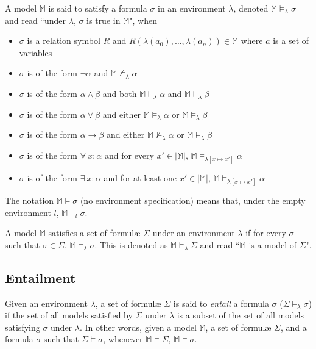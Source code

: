 		A model $\mathbb{M}$ is said to satisfy a formula $\sigma$ in an
		environment $\lambda$, denoted $\mathbb{M} \models_\lambda \sigma$ and
		read ``under $\lambda$, $\sigma$ is true in $\mathbb{M}$", when
		\begin{itemize}
		\item $\sigma$ is a relation symbol $R$ and $R(\lambda(a_0) , \ldots , \lambda(a_n)) \in \mathbb{M}$ where $a$ is a set of variables
		\item $\sigma$ is of the form $\neg\alpha$ and $\mathbb{M} \not\models_\lambda \alpha$
		\item $\sigma$ is of the form $\alpha\wedge\beta$ and both $\mathbb{M} \models_\lambda \alpha$ and $\mathbb{M} \models_\lambda \beta$
		\item $\sigma$ is of the form $\alpha\vee\beta$ and either $\mathbb{M} \models_\lambda \alpha$ or $\mathbb{M} \models_\lambda \beta$
		\item $\sigma$ is of the form $\alpha\to\beta$ and either $\mathbb{M} \not\models_\lambda \alpha$ or $\mathbb{M} \models_\lambda \beta$
		\item $\sigma$ is of the form $\forall\ x : \alpha$  and for every $x' \in |\mathbb{M}|$, $\mathbb{M} \models_{\lambda[x \mapsto x']} \alpha$
		\item $\sigma$ is of the form $\exists\ x : \alpha$  and for at least one $x' \in |\mathbb{M}|$, $\mathbb{M} \models_{\lambda[x \mapsto x']} \alpha$
		\end{itemize}
		The notation $\mathbb{M} \models \sigma$ (no environment specification)
		means that, under the empty environment $l$, $\mathbb{M} \models_l \sigma$.

		A model $\mathbb{M}$ satisfies a set of formul{\ae} $\Sigma$ under an
		environment $\lambda$ if for every $\sigma$ such that $\sigma \in
		\Sigma$, $\mathbb{M} \models_\lambda \sigma$. This is denoted as
		$\mathbb{M} \models_\lambda \Sigma$ and read ``$\mathbb{M}$ is a model
		of $\Sigma$".

	\subsection{Entailment}

		Given an environment $\lambda$, a set of formul{\ae} $\Sigma$ is said
		to \emph{entail} a formula $\sigma$ ($\Sigma \models_\lambda \sigma$)
		if the set of all models satisfied by $\Sigma$ under $\lambda$ is a
		subset of the set of all models satisfying $\sigma$ under $\lambda$.
		In other words, given a model $\mathbb{M}$, a set of formul{\ae}
		$\Sigma$, and a formula $\sigma$ such that $\Sigma \models \sigma$,
		whenever $\mathbb{M} \models \Sigma$, $\mathbb{M} \models \sigma$.

